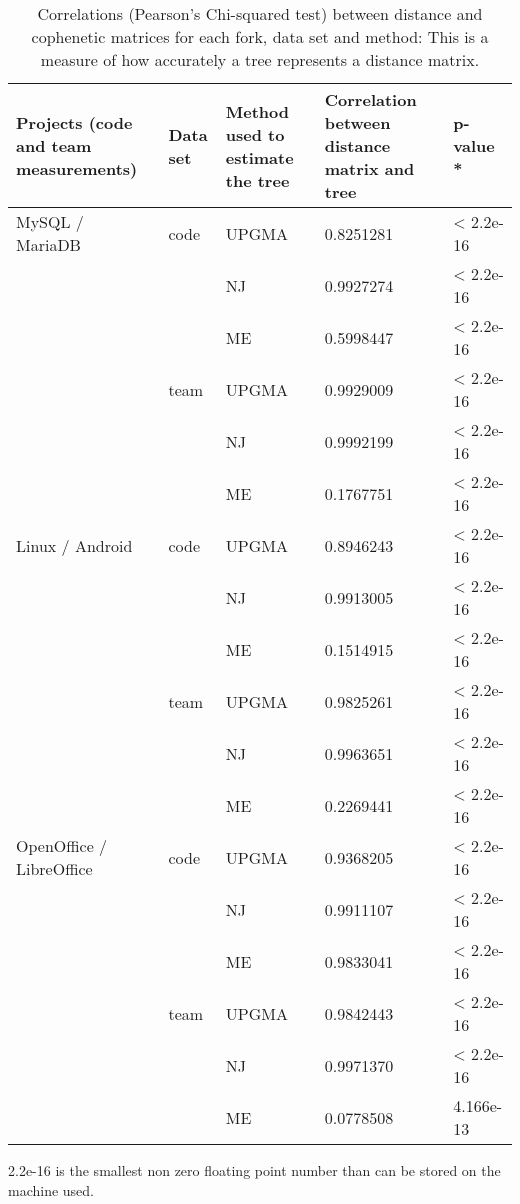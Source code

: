 \begin{table}[H]
\caption{Correlations (Pearson's Chi-squared test) between distance and cophenetic matrices for
each fork, data set and method: This is a measure of how accurately a tree represents a distance
matrix.}
\label{table:ch4_rq2_corr} 
\centering
\begin{tabu} to 
  \toprule
  Projects (code and team measurements) & Data set & Method used to estimate the tree & Correlation between distance matrix and tree & p-value * \\
  \midrule  
  MySQL / MariaDB & code & UPGMA & 0.8251281 & < 2.2e-16 \\
  & & NJ & 0.9927274 & < 2.2e-16 \\
  & & ME & 0.5998447 & < 2.2e-16 \\
  & team & UPGMA & 0.9929009 & < 2.2e-16 \\
  & & NJ & 0.9992199 & < 2.2e-16 \\
  & & ME & 0.1767751 & < 2.2e-16 \\
  Linux / Android & code & UPGMA & 0.8946243 & < 2.2e-16 \\
  & & NJ & 0.9913005 & < 2.2e-16 \\
  & & ME & 0.1514915 & < 2.2e-16 \\
  & team & UPGMA & 0.9825261 & < 2.2e-16 \\
  & & NJ & 0.9963651 & < 2.2e-16 \\
  & & ME & 0.2269441 & < 2.2e-16 \\
  OpenOffice / LibreOffice & code & UPGMA & 0.9368205 & < 2.2e-16 \\
  & & NJ & 0.9911107 & < 2.2e-16 \\
  & & ME & 0.9833041 & < 2.2e-16 \\
  & team & UPGMA & 0.9842443 & < 2.2e-16 \\
  & & NJ & 0.9971370 & < 2.2e-16 \\
  & & ME & 0.0778508 & 4.166e-13 \\
  \bottomrule
\end{tabu}
\end{table}
\noindent * 2.2e-16 is the smallest non zero floating point number than can be stored on the machine used.
